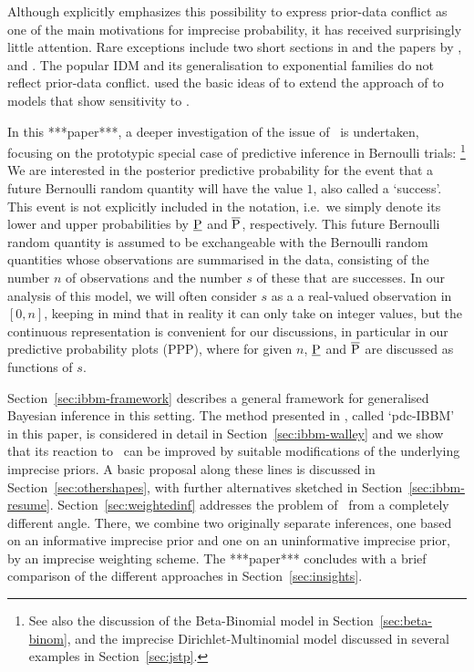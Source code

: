 Although \textcite[p.~6]{1991:walley} explicitly emphasizes this possibility to
express prior-data conflict as one of the main motivations for imprecise probability,
it has received surprisingly little attention. Rare exceptions include two short sections in \textcite[p.~6 and \S 5.4]{1991:walley}
and the papers by \textcite{1991:pericchi}, \textcite{1994:coolen} and
\textcite{2005:whitcomb}. The popular IDM \parencite{1996:walley::idm, 2009:bernard}
and its generalisation to exponential families \parencite{2005:quaeghebeurcooman} do not reflect prior-data conflict.
\textcite{Walter2009a} used the basic ideas of \textcite[\S 5.4]{1991:walley} to extend the approach of
\textcite{2005:quaeghebeurcooman} to models that show sensitivity to \pdc.

In this ***paper***, a deeper investigation of the issue of \pdc\ is undertaken,
focusing on the prototypic special case of predictive inference in Bernoulli trials:%
\footnote{See also the discussion of the Beta-Binomial model in Section~\ref{sec:beta-binom},
and the imprecise Dirichlet-Multinomial model discussed in several examples in Section~\ref{sec:jstp}.}
We are interested in the posterior predictive
probability for the event that a future Bernoulli random quantity
will have the value $1$, also called a `success'. This event is not
explicitly included in the notation, i.e.\ we simply denote its lower
and upper probabilities by $\underline{\operatorname{P}}$ and $\overline{\operatorname{P}}$, respectively. This future Bernoulli random
quantity is assumed to be exchangeable with the Bernoulli random
quantities whose observations are summarised in the data, consisting
of the number $n$ of observations and the number $s$ of these that are
successes. In our analysis of this model, we
will often consider $s$ as a a real-valued observation in $[0,n]$,
keeping in mind that in reality it can only take on
integer values, but the continuous representation is convenient for
our discussions, in particular in our predictive probability plots (PPP),
where for given $n$, $\underline{\operatorname{P}}$ and $\overline{\operatorname{P}}$ are discussed as functions of $s$.

\medskip

Section~\ref{sec:ibbm-framework} describes a general framework for
generalised Bayesian inference in this setting. The method presented in \textcite[\S 5.4.3]{1991:walley},
called `pdc-IBBM' in this paper, is considered in detail in Section~\ref{sec:ibbm-walley}
and we show that its reaction to \pdc\ can be improved
by suitable modifications of the underlying imprecise
priors. A basic proposal along these lines is discussed in
Section~\ref{sec:othershapes}, with further alternatives
sketched in Section~\ref{sec:ibbm-resume}.
Section~\ref{sec:weightedinf} addresses the problem of \pdc\ from a
completely different angle. There, we combine two originally separate
inferences, one based on an informative imprecise prior and one
on an uninformative imprecise prior, by an imprecise weighting
scheme. The ***paper*** concludes with a brief comparison of the different
approaches in Section~\ref{sec:insights}.



